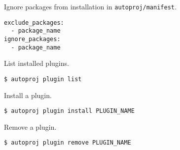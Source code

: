 \documentclass[9pt]{innovativeinnovation-cheatsheet}
\begin{document}
\begin{multicols*}{3}

Ignore packages from installation in \verb|autoproj/manifest|.
\begin{lstlisting}
exclude_packages:
  - package_name
ignore_packages:
  - package_name
\end{lstlisting}


List installed plugins.
\begin{lstlisting}
$ autoproj plugin list
\end{lstlisting}

Install a plugin.
\begin{lstlisting}
$ autoproj plugin install PLUGIN_NAME
\end{lstlisting}

Remove a plugin.
\begin{lstlisting}
$ autoproj plugin remove PLUGIN_NAME
\end{lstlisting}

\vfill


\end{multicols*}
\end{document}
